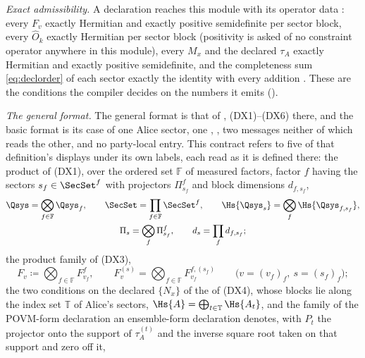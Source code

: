 \begin{definition}
\emph{Exact admissibility.} A declaration reaches this module with its
operator data : every $F_v$ exactly Hermitian and
exactly positive semidefinite per sector block, every $\hat O_k$ exactly
Hermitian per sector block (positivity is asked of no constraint operator
anywhere in this module), every $M_x$ and the declared $\tau_A$ exactly
Hermitian and exactly positive semidefinite, and the completeness sum
\eqref{eq:declorder} of each sector exactly the identity with every addition
. These are the conditions the compiler decides on the
numbers it emits ().

\emph{The general format.} The general format is that of
, (DX1)--(DX6) there, and the basic
format is its case of one Alice sector, one ,
, two messages neither of which reads the other, and no
party-local entry. This contract refers to five of that definition's
displays under its own labels, each read as it is defined there: the
product  of (DX1), over the ordered set $\mathbb{F}$ of
measured factors, factor $f$ having the sectors $s_f\in\SecSet^{f}$ with
projectors $\Pi^{f}_{s_f}$ and block dimensions $d_{f,s_f}$,
\begin{equation}\label{eq:productmap}
\begin{gathered}
  \Qsys=\bigotimes_{f\in\mathbb{F}}\Qsys_f,\qquad
  \SecSet=\prod_{f\in\mathbb{F}}\SecSet^{f},\qquad
  \Hs{\Qsys_s}=\bigotimes_{f}\Hs{\Qsys_{f,s_f}},\\
  \Pi_s=\bigotimes_f\Pi^{f}_{s_f},\qquad d_s=\prod_fd_{f,s_f};
\end{gathered}
\end{equation}
the product family of (DX3),
\begin{equation}\label{eq:productfamily}
  F_v\coloneqq\bigotimes_{f\in\mathbb{F}}F^{f}_{v_f},\qquad
  F^{(s)}_v=\bigotimes_{f\in\mathbb{F}}F^{f,(s_f)}_{v_f}
  \qquad\big(v=(v_f)_f,\ s=(s_f)_f\big);
\end{equation}
the two conditions on the declared $\{N_x\}$ of the  of
(DX4), whose blocks lie along the index set $\mathbb{T}$ of Alice's sectors,
$\Hs{A}=\bigoplus_{t\in\mathbb{T}}\Hs{A_t}$, and the family of the POVM-form
declaration an ensemble-form declaration denotes, with $P_t$ the projector
onto the support of $\tau^{(t)}_A$ and the inverse square root taken on that
support and zero off it,
\begin{equation}\label{eq:ensembleform}

\end{equation}
\end{definition}
